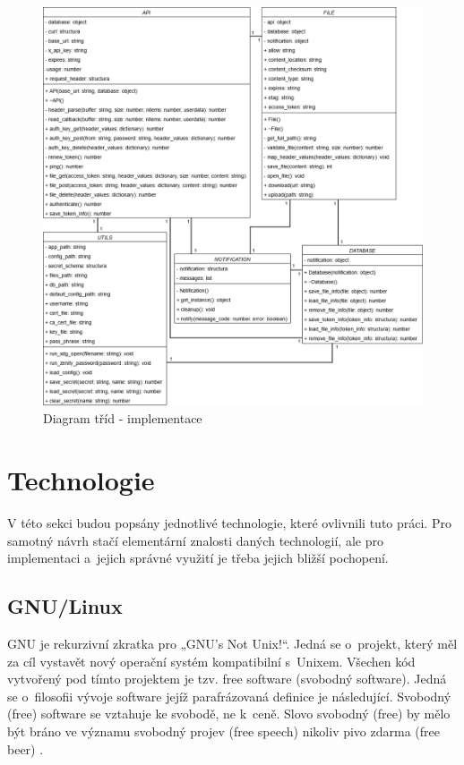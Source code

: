 \newpage

\begin{figure}[h]
    \includegraphics[width=1\linewidth]{other-fig/class_diagram_after_implementation.png}
    \caption{Diagram tříd - implementace}
    \label{fig:class_diagram_implementation}
\end{figure}

\section{Technologie}

V této sekci budou popsány jednotlivé technologie, které ovlivnili tuto práci. Pro samotný návrh stačí elementární znalosti daných technologií, ale pro
implementaci a jejich správné využití je třeba jejich bližší pochopení.

\subsection{GNU/Linux}

GNU je rekurzivní zkratka pro „GNU's Not Unix!“. Jedná se o projekt, který měl za cíl vystavět nový operační systém kompatibilní s Unixem. Všechen kód vytvořený pod
tímto projektem je tzv. free software (svobodný software). Jedná se o filosofii vývoje software jejíž parafrázovaná definice je následující. Svobodný (free) software se
vztahuje ke svobodě, ne k ceně. Slovo svobodný (free) by mělo být bráno ve významu svobodný projev (free speech) nikoliv pivo zdarma (free beer) \cite{FreeSoftware}.

